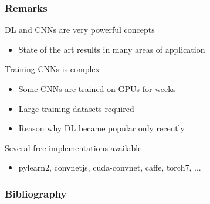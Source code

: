 \documentclass[xetex,professionalfont]{beamer}
\begin{document}
\begin{frame}
\frametitle{Remarks}

DL and CNNs are very powerful concepts
\begin{itemize}
    \item State of the art results in many areas of application
\end{itemize}

\bigskip
Training CNNs is complex
\begin{itemize}
    \item Some CNNs are trained on GPUs for weeks
    \item Large training datasets required %
    \item Reason why DL became popular only recently
\end{itemize}

\bigskip
Several free implementations available
\begin{itemize}
    \item pylearn2, convnetjs, cuda-convnet, caffe, torch7, ...
\end{itemize}

\end{frame}


\begin{frame}[allowframebreaks=0.8]
\frametitle{Bibliography}

\printbibliography

\end{frame}
\end{document}
